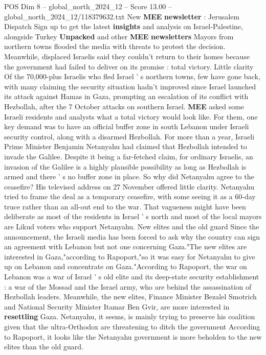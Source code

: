 \begin{textsample}{POS Dim 8 – global\_north\_2024\_12 – Score 13.00 – global\_north\_2024\_12/118379632.txt}  \label{ex:f8_pos_098}
New \textbf{MEE} \textbf{newsletter} : Jerusalem Dispatch Sign up to get the latest \textbf{insights} and analysis on Israel-Palestine, alongside Turkey \textbf{Unpacked} and other \textbf{MEE} \textbf{newsletters} Mayors from northern towns flooded the media with threats to protest the decision.
Meanwhile, displaced Israelis said they couldn't return to their homes because the government had failed to deliver on its promise : total victory.
Little clarity Of the 70,000-plus Israelis who fled Israel ' s northern towns, few have gone back, with many claiming the security situation hadn't improved since Israel launched its attack against Hamas in Gaza, prompting an escalation of its conflict with Hezbollah, after the 7 October attacks on southern Israel. \textbf{MEE} asked some Israeli residents and analysts what a total victory would look like.
For them, one key demand was to have an official buffer zone in south Lebanon under Israeli security control, along with a disarmed Hezbollah.
For more than a year, Israeli Prime Minister Benjamin Netanyahu had claimed that Hezbollah intended to invade the Galilee.
Despite it being a far-fetched claim, for ordinary Israelis, an invasion of the Galilee is a highly plausible possibility as long as Hezbollah is armed and there ' s no buffer zone in place.
So why did Netanyahu agree to the ceasefire?
His televised address on 27 November offered little clarity.
Netanyahu tried to frame the deal as a temporary ceasefire, with some seeing it as a 60-day truce rather than an all-out end to the war.
That vagueness might have been deliberate as most of the residents in Israel ' s north and most of the local mayors are Likud voters who support Netanyahu.
New elites and the old guard Since the announcement, the Israeli media has been forced to ask why the country can sign an agreement with Lebanon but not one concerning Gaza."The new elites are interested in Gaza,"according to Rapoport,"so it was easy for Netanyahu to give up on Lebanon and concentrate on Gaza."According to Rapoport, the war on Lebanon was a war of Israel ' s old elite and its deep-state security establishment : a war of the Mossad and the Israel army, who are behind the assassination of Hezbollah leaders.
Meanwhile, the new elites, Finance Minister Bezalel Smotrich and National Security Minister Itamar Ben Gvir, are more interested in \textbf{resettling} Gaza.
Netanyahu, it seems, is mainly trying to preserve his coalition given that the ultra-Orthodox are threatening to ditch the government According to Rapoport, it looks like the Netanyahu government is more beholden to the new elites than the old guard.

\end{textsample}
